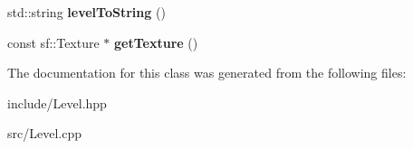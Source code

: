 \begin{DoxyCompactItemize}
\item 
\hypertarget{class_level_a78f28f8afdcc244f5e4bba1a93876de0}{std\-::string {\bfseries level\-To\-String} ()}\label{class_level_a78f28f8afdcc244f5e4bba1a93876de0}

\item 
\hypertarget{class_level_a956b87cc7a28078b565bb510e8316d8d}{const sf\-::\-Texture $\ast$ {\bfseries get\-Texture} ()}\label{class_level_a956b87cc7a28078b565bb510e8316d8d}

\end{DoxyCompactItemize}


The documentation for this class was generated from the following files\-:\begin{DoxyCompactItemize}
\item 
include/Level.\-hpp\item 
src/Level.\-cpp\end{DoxyCompactItemize}
